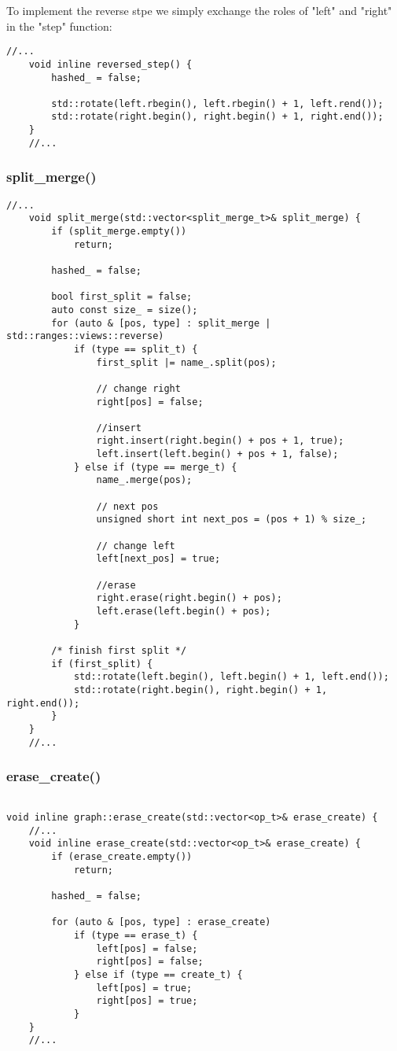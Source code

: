 \documentclass[11pt]{article}
\begin{document}
To implement the reverse stpe we simply exchange the roles of "left" and "right" in the "step" function:

\begin{lstlisting}[style=CStyle]
	//...
  	void inline reversed_step() {
  		hashed_ = false;

  		std::rotate(left.rbegin(), left.rbegin() + 1, left.rend());
		std::rotate(right.begin(), right.begin() + 1, right.end());
  	}
  	//...
\end{lstlisting}

\subsubsection{split\_merge()}

\begin{lstlisting}[style=CStyle]
	//...
	void split_merge(std::vector<split_merge_t>& split_merge) {
		if (split_merge.empty())
			return;
		
		hashed_ = false;
		
		bool first_split = false;
		auto const size_ = size();
		for (auto & [pos, type] : split_merge | std::ranges::views::reverse)
			if (type == split_t) {
				first_split |= name_.split(pos);

				// change right
				right[pos] = false;

				//insert
				right.insert(right.begin() + pos + 1, true);
				left.insert(left.begin() + pos + 1, false);
			} else if (type == merge_t) {
				name_.merge(pos);

				// next pos
				unsigned short int next_pos = (pos + 1) % size_;
					
				// change left
				left[next_pos] = true;

				//erase
				right.erase(right.begin() + pos);
				left.erase(left.begin() + pos);
			}

		/* finish first split */
		if (first_split) {
			std::rotate(left.begin(), left.begin() + 1, left.end());
			std::rotate(right.begin(), right.begin() + 1, right.end());
		}
	}
	//...
\end{lstlisting}

\subsubsection{erase\_create()}

\begin{lstlisting}[style=CStyle]

void inline graph::erase_create(std::vector<op_t>& erase_create) {
	//...
	void inline erase_create(std::vector<op_t>& erase_create) {
		if (erase_create.empty())
			return;
			
		hashed_ = false;

		for (auto & [pos, type] : erase_create)
			if (type == erase_t) {
				left[pos] = false;
				right[pos] = false;
			} else if (type == create_t) {
				left[pos] = true;
				right[pos] = true;
			}
	}
	//...
\end{lstlisting}
\end{document}
